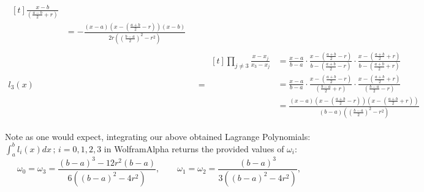\documentclass[]{article}
\begin{document}
\begin{enumerate}
\begin{align*}
\begin{aligned}[t]
\frac{x-b}{\left(\frac{a-b}{2}+r\right)}\\
&= -\frac{
(x-a)\left(x-\left(\frac{a+b}{2}-r\right)\right)(x-b)
}{
2r\left(\left(\frac{b-a}{2}\right)^{2}-r^{2}\right)
}
\end{aligned}
\\[8pt]
l_3(x) &= \begin{aligned}[t]
\prod_{j\ne 3}\frac{x-x_j}{x_3-x_j}
&= \frac{x-a}{b-a}
\cdot
\frac{x-\left(\frac{a+b}{2}-r\right)}{b-\left(\frac{a+b}{2}-r\right)}
\cdot
\frac{x-\left(\frac{a+b}{2}+r\right)}{b-\left(\frac{a+b}{2}+r\right)}\\
&= \frac{x-a}{b-a}
\cdot
\frac{x-\left(\frac{a+b}{2}-r\right)}{\left(\frac{b-a}{2}+r\right)}
\cdot
\frac{x-\left(\frac{a+b}{2}+r\right)}{\left(\frac{b-a}{2}-r\right)}\\
&= \frac{
(x-a)\left(x-\left(\frac{a+b}{2}-r\right)\right)\left(x-\left(\frac{a+b}{2}+r\right)\right)
}{
(b-a)\left(\left(\frac{b-a}{2}\right)^{2}-r^{2}\right)
}
\end{aligned}
\end{align*}

\noindent Note as one would expect, integrating our above obtained Lagrange Polynomials: \newline$\displaystyle \int_a^b l_i(x)dx \,;\,i=0,1,2,3$ in WolframAlpha returns the provided values of $\omega_i:$
\[
\omega_0=\omega_3=\frac{(b-a)^3-12r^2(b-a)}{6\left((b-a)^2-4r^2\right)},
\qquad
\omega_1=\omega_2=\frac{(b-a)^3}{3\left((b-a)^2-4r^2\right)},
\]


\end{enumerate}
\end{document}
